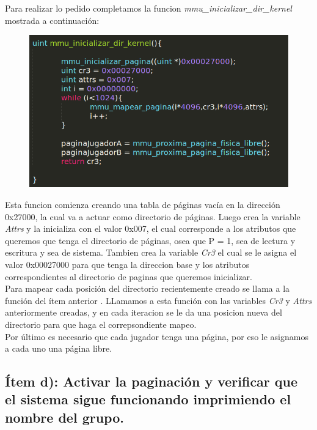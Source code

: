 	  Para realizar lo pedido completamos la funcion \textit{mmu\_inicializar\_dir\_kernel} mostrada a continuación:

	  \begin{figure}[H]
	  \begin{center}
  	  \includegraphics[width=\linewidth]{ejercicio3/inikernel.png}
  	  \caption{{\small }}
	  \endminipage
	  \end{center}
	  \end{figure}

	  Esta funcion comienza creando una tabla de páginas vacía en la dirección 0x27000, la cual va a actuar como directorio de páginas. Luego crea la variable \textit{Attrs} y la inicializa con el valor 0x007, el cual corresponde a los atributos que queremos que tenga el directorio de páginas, osea que P = 1, sea de lectura y escritura y sea de sistema. Tambien crea la variable \textit{Cr3} el cual se le asigna el valor  0x00027000 para que tenga la direccion base y los atributos correspondientes al directorio de paginas que queremos inicializar.\\

	 Para mapear cada posición del directorio recientemente creado se llama a la función del ítem anterior . LLamamos a esta función con las variables  \textit{Cr3} y \textit{Attrs} anteriormente creadas, y en cada iteracion se le da una posicion nueva del directorio para que haga el correpsondiente mapeo. \\

	 Por último es necesario que cada jugador tenga una página, por eso le asignamos a cada uno una página libre.

\subsection{Ítem d): Activar la paginación y verificar que el sistema sigue funcionando imprimiendo el nombre del grupo.}

